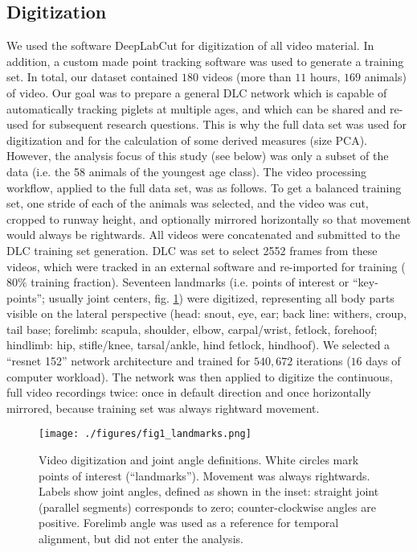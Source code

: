 \subsection{Digitization}
\label{sec:org3ecf574}
We used the software DeepLabCut \citep[DLC,][]{Mathis2018} for digitization of all video material.
In addition, a custom made point tracking software \citep{MMielke2020} was used to generate a training set.
In total, our dataset contained \(180\) videos (more than \(11\) hours, \(169\) animals) of video.
Our goal was to prepare a general DLC network which is capable of automatically tracking piglets at multiple ages, and which can be shared and re-used for subsequent research questions.
This is why the full data set was used for digitization and for the calculation of some derived measures (size PCA).
However, the analysis focus of this study (see below) was only a subset of the data (i.e. the 58 animals of the youngest age class).
The video processing workflow, applied to the full data set, was as follows.
To get a balanced training set, one stride of each of the animals was selected, and the video was cut, cropped to runway height, and optionally mirrored horizontally so that movement would always be rightwards.
All videos were concatenated and submitted to the DLC training set generation.
DLC was set to select 2552 frames from these videos, which were tracked in an external software and re-imported for training (\(80 \%\) training fraction).
Seventeen landmarks (i.e. points of interest or ``key-points''; usually joint centers, fig. \ref{fig:landmarks}) were digitized, representing all body parts visible on the lateral perspective (head: snout, eye, ear; back line: withers, croup, tail base; forelimb: scapula, shoulder, elbow, carpal/wrist, fetlock, forehoof; hindlimb: hip, stifle/knee, tarsal/ankle, hind fetlock, hindhoof).
We selected a ``resnet 152'' network architecture and trained for \(540,672\) iterations (\(16\) days of computer workload).
The network was then applied to digitize the continuous, full video recordings twice: once in default direction and once horizontally mirrored, because training set was always rightward movement.

\begin{figure}[t]
\centering
\texttt{[image: ./figures/fig1\_landmarks.png]}
\caption{\label{fig:landmarks}Video digitization and joint angle definitions. White circles mark points of interest (``landmarks''). Movement was always rightwards. Labels show joint angles, defined as shown in the inset: straight joint (parallel segments) corresponds to zero; counter-clockwise angles are positive. Forelimb angle was used as a reference for temporal alignment, but did not enter the analysis.}
\end{figure}



